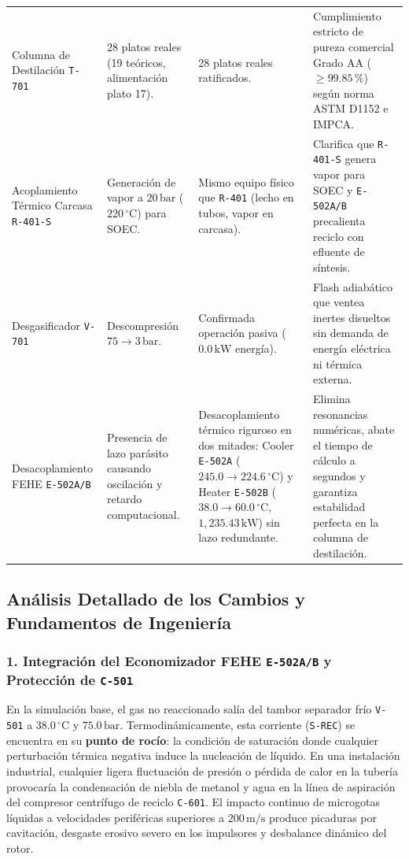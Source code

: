 \documentclass[11pt,a4paper]{article}
\begin{document}
\begin{table}[H]
\begin{tabularx}{\textwidth}{p{3.8cm} p{3.3cm} p{3.5cm} X}
\addlinespace
Columna de Destilación \texttt{T-701} & 28 platos reales (19 teóricos, alimentación plato 17). & 28 platos reales ratificados. & Cumplimiento estricto de pureza comercial Grado AA ($\ge 99.85\,\%$) según norma ASTM D1152 e IMPCA. \\
\addlinespace
Acoplamiento Térmico Carcasa \texttt{R-401-S} & Generación de vapor a $20\,\text{bar}$ ($220\,^\circ\text{C}$) para SOEC. & Mismo equipo físico que \texttt{R-401} (lecho en tubos, vapor en carcasa). & Clarifica que \texttt{R-401-S} genera vapor para SOEC y \texttt{E-502A/B} precalienta reciclo con efluente de síntesis. \\
\addlinespace
Desgasificador \texttt{V-701} & Descompresión $75 \to 3\,\text{bar}$. & Confirmada operación pasiva ($0.0\,\text{kW}$ energía). & Flash adiabático que ventea inertes disueltos sin demanda de energía eléctrica ni térmica externa. \\
\addlinespace
Desacoplamiento FEHE \texttt{E-502A/B} & Presencia de lazo parásito causando oscilación y retardo computacional. & Desacoplamiento térmico riguroso en dos mitades: Cooler \texttt{E-502A} ($245.0 \to 224.6\,^\circ\text{C}$) y Heater \texttt{E-502B} ($38.0 \to 60.0\,^\circ\text{C}$, $1{,}235.43\,\text{kW}$) sin lazo redundante. & Elimina resonancias numéricas, abate el tiempo de cálculo a segundos y garantiza estabilidad perfecta en la columna de destilación. \\
\bottomrule
\end{tabularx}
\end{table}

\subsection{Análisis Detallado de los Cambios y Fundamentos de Ingeniería}

\subsubsection{1. Integración del Economizador FEHE \texttt{E-502A/B} y Protección de \texttt{C-501}}
En la simulación base, el gas no reaccionado salía del tambor separador frío \texttt{V-501} a $38.0\,^\circ\text{C}$ y $75.0\,\text{bar}$. Termodinámicamente, esta corriente (\texttt{S-REC}) se encuentra en su \textbf{punto de rocío}: la condición de saturación donde cualquier perturbación térmica negativa induce la nucleación de líquido.
En una instalación industrial, cualquier ligera fluctuación de presión o pérdida de calor en la tubería provocaría la condensación de niebla de metanol y agua en la línea de aspiración del compresor centrífugo de reciclo \texttt{C-601}. El impacto continuo de microgotas líquidas a velocidades periféricas superiores a $200\,\text{m/s}$ produce picaduras por cavitación, desgaste erosivo severo en los impulsores y desbalance dinámico del rotor.
\end{document}
